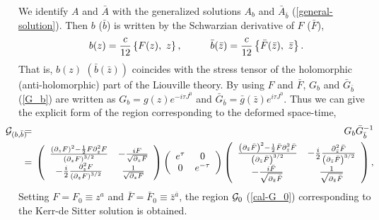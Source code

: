 \documentclass[a4paper,11pt]{article}
\begin{document}
We identify $A$ and $\bar{A}$ with the generalized solutions 
$A_b$ and $\bar{A}_{\bar{b}}$ (\ref{general-solution}).
Then $b$ ($\bar{b}$) is written by the Schwarzian derivative of 
$F$ ($\bar{F}$),
\begin{equation}
\label{stress}
b(z)=\frac{c}{12}\left\{F(z), \ z\right\}, \hspace{10mm}
\bar{b}(\bar{z})=\frac{c}{12}\left\{\bar{F}(\bar{z}), \ \bar{z}\right\}.
\end{equation}
That is, $b(z)$ $\left(\bar{b}(\bar{z})\right)$ coincides with 
the stress tensor of the holomorphic (anti-holomorphic) part 
of the Liouville theory.
By using $F$ and $\bar{F}$, $G_b$ and $\bar{G}_{\bar{b}}$ (\ref{G_b}) 
are written as $G_b=g(z)e^{-i\tau J^0}$ and 
$\bar{G}_{\bar{b}}=\bar{g}(\bar{z})e^{i\tau J^0}$.
Thus we can give the explicit form of the region corresponding to 
the deformed space-time,
\begin{eqnarray}
\hspace*{-5mm}
{\cal G}_{(b, \bar{b})}
  \hspace{-2mm}&=& \hspace{-2mm}G_b \bar{G}_{\bar{b}}^{-1} \nonumber \\
  \hspace{-2mm}&=& \hspace{-2mm}
  \left(\begin{array}{cc}
   \frac{\left(\partial_z F\right)^2-\frac{1}{2}F\partial_z^2 F}
          {\left(\partial_z F\right)^{3/2}} & 
   -\frac{iF}{\sqrt{\partial_z F}} \\
   -\frac{i}{2}\frac{\partial_z^2 F}
                   {\left(\partial_z F\right)^{3/2}} &
    \frac{1}{\sqrt{\partial_zF}}
       \end{array}\right)
 \left(\begin{array}{cc}
  e^{\tau} &  0 \\
  0 & e^{-\tau}
       \end{array}\right)
 \left(\begin{array}{cc}
   \frac{\left(\partial_{\bar{z}} \bar{F}\right)^2
            -\frac{1}{2}\bar{F}\partial_{\bar{z}}^2 \bar{F}}
          {\left(\partial_{\bar{z}} \bar{F}\right)^{3/2}} & 
             -\frac{i}{2}\frac{\partial_{\bar{z}}^2 \bar{F}}
               {\left(\partial_{\bar{z}} \bar{F}\right)^{3/2}} \\
   -\frac{i\bar{F}}{\sqrt{\partial_{\bar{z}} \bar{F}}} &
   \frac{1}{\sqrt{\partial_{\bar{z}} \bar{F}}}    
       \end{array}\right),
\end{eqnarray}
Setting $F=F_0\equiv z^a$ and 
$\bar{F}=\bar{F}_0\equiv\bar{z}^{\bar{a}}$, 
the region ${\cal G}_0$ (\ref{cal-G_0}) corresponding to the Kerr-de Sitter
solution is obtained.  
\end{document}
